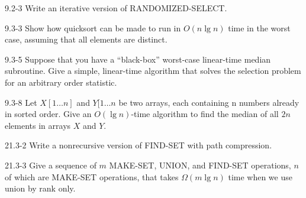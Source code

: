 





\homeworkheader{\classnameandsection}

\begin{problem}{9.2-3}
  Write an iterative version of RANDOMIZED-SELECT.
\end{problem}

\begin{problem}{9.3-3}
  Show how quicksort can be made to run in $O(n \lg n)$ time in the worst case, assuming that all elements are
  distinct.
\end{problem}

\begin{problem}{9.3-5}
  Suppose that you have a ``black-box'' worst-case linear-time median subroutine. Give a simple, linear-time algorithm
  that solves the selection problem for an arbitrary order statistic.
\end{problem}

\begin{problem}{9.3-8}
  Let $X[1\ldots n]$ and $Y[1\ldots n$ be two arrays, each containing n numbers already in sorted order. Give an $O(\lg
  n)$-time algorithm to find the median of all $2n$ elements in arrays $X$ and $Y$.
\end{problem}

\begin{problem}{21.3-2}
  Write a nonrecursive version of FIND-SET with path compression.
\end{problem}

\begin{problem}{21.3-3}
  Give a sequence of $m$ MAKE-SET, UNION, and FIND-SET operations, $n$ of which are MAKE-SET operations, that takes
  $\Omega(m \lg n)$ time when we use union by rank only.
\end{problem}


